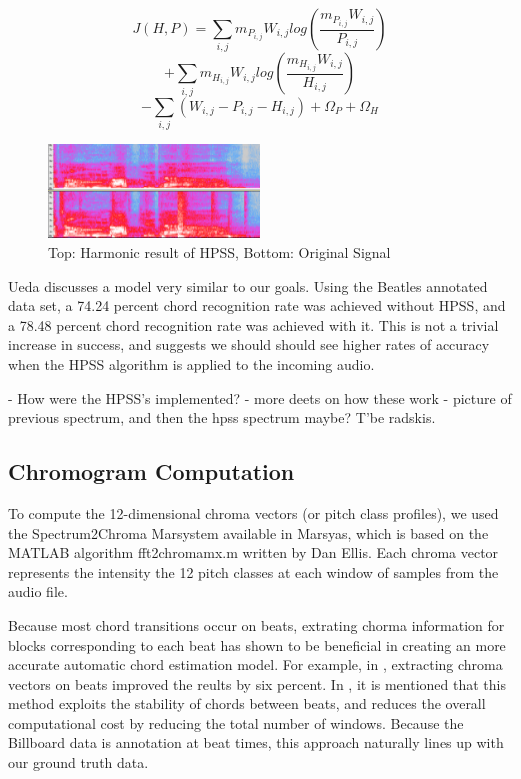 \documentclass{article}
\begin{document}
$$J(H,P) = \sum_{i,j} m_{P_{i,j}} W_{i,j} log (\frac{m_{P_{i,j}} W_{i,j}}{P_{i,j}})$$
$$       + \sum_{i,j} m_{H_{i,j}} W_{i,j} log (\frac{m_{H_{i,j}} W_{i,j}}{H_{i,j}})$$
$$       - \sum_{i,j} (W_{i,j} - P_{i,j} - H_{i,j}) + \Omega_{P} + \Omega_{H}$$

\begin{figure}
   \centering
    \includegraphics[width=0.5\textwidth]{hpssspec.png}
   \caption{Top: Harmonic result of HPSS, Bottom: Original Signal}
   \label{fig:HPSS}
\end{figure}

Ueda \cite{Ueda:19} discusses a model very similar to our goals. Using the Beatles
annotated data set, a 74.24 percent chord recognition rate was achieved without HPSS, and
a 78.48 percent chord recognition rate was achieved with it. This is not a trivial increase in
success, and suggests we should should see higher rates of accuracy when the
HPSS algorithm is applied to the incoming audio.

- How were the HPSS's implemented?
- more deets on how these work
- picture of previous spectrum, and then the hpss spectrum maybe? T'be radskis.

\subsection{Chromogram Computation}

To compute the 12-dimensional chroma vectors (or pitch class profiles), we used the
Spectrum2Chroma Marsystem available in Marsyas, which is based on the MATLAB algorithm
fft2chromamx.m written by Dan Ellis.
Each chroma vector represents the intensity the 12 pitch classes at each window of
samples from the audio file.

Because most chord transitions occur on beats, extrating chorma information for blocks corresponding
to each beat has shown to be beneficial in creating an more accurate automatic chord
estimation model. For example, in \cite{Zenz:20}, extracting chroma vectors on beats improved
the reults by six percent. In \cite{McVicor:00}, it is mentioned that this method exploits the stability
of chords between beats, and reduces the overall computational cost by reducing the total
number of windows. Because the Billboard data is annotation at beat times, this approach naturally
lines up with our ground truth data.
\end{document}
